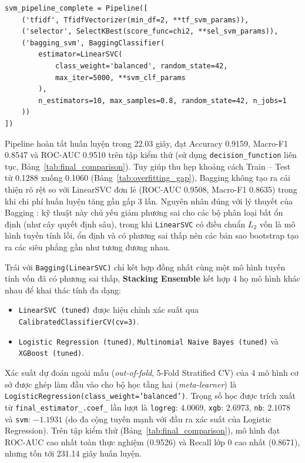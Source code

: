 \begin{lstlisting}[caption={Cài đặt Pipeline khép kín cho mô hình LinearSVC + Bagging}, label={lst:svm_pipeline}]
svm_pipeline_complete = Pipeline([
    ('tfidf', TfidfVectorizer(min_df=2, **tf_svm_params)),
    ('selector', SelectKBest(score_func=chi2, **sel_svm_params)),
    ('bagging_svm', BaggingClassifier(
        estimator=LinearSVC(
            class_weight='balanced', random_state=42,
            max_iter=5000, **svm_clf_params
        ),
        n_estimators=10, max_samples=0.8, random_state=42, n_jobs=1
    ))
])
\end{lstlisting}

Pipeline hoàn tất huấn luyện trong 22.03 giây, đạt Accuracy 0.9159, Macro-F1 0.8547 và ROC-AUC 0.9510 trên tập kiểm thử (sử dụng \texttt{decision\_function} liên tục, Bảng~\ref{tab:final_comparison}). Tuy giúp thu hẹp khoảng cách Train -- Test từ 0.1288 xuống 0.1060 (Bảng~\ref{tab:overfitting_gap}), Bagging không tạo ra cải thiện rõ rệt so với LinearSVC đơn lẻ (ROC-AUC 0.9508, Macro-F1 0.8635) trong khi chi phí huấn luyện tăng gần gấp 3 lần. Nguyên nhân đúng với lý thuyết của Bagging \cite{breiman1996}: kỹ thuật này chủ yếu giảm phương sai cho các bộ phân loại bất ổn định (như cây quyết định sâu), trong khi \texttt{LinearSVC} có điều chuẩn $L_2$ vốn là mô hình tuyến tính lồi, ổn định và có phương sai thấp nên các bản sao bootstrap tạo ra các siêu phẳng gần như tương đương nhau.

Trái với \texttt{Bagging(LinearSVC)} chỉ kết hợp đồng nhất cùng một mô hình tuyến tính vốn đã có phương sai thấp, \textbf{Stacking Ensemble} kết hợp 4 họ mô hình khác nhau để khai thác tính đa dạng:
\begin{itemize}
    \item \texttt{LinearSVC (tuned)} được hiệu chỉnh xác suất qua \texttt{CalibratedClassifierCV(cv=3)}.
    \item \texttt{Logistic Regression (tuned)}, \texttt{Multinomial Naive Bayes (tuned)} và \texttt{XGBoost (tuned)}.
\end{itemize}
Xác suất dự đoán ngoài mẫu (\textit{out-of-fold}, 5-Fold Stratified CV) của 4 mô hình cơ sở được ghép làm đầu vào cho bộ học tầng hai (\textit{meta-learner}) là \texttt{LogisticRegression(class\_weight='balanced')}. Trọng số học được trích xuất từ \texttt{final\_estimator\_.coef\_} lần lượt là \texttt{logreg}: $4.0069$, \texttt{xgb}: $2.6973$, \texttt{nb}: $2.1078$ và \texttt{svm}: $-1.1931$ (do đa cộng tuyến mạnh với đầu ra xác suất của Logistic Regression). Trên tập kiểm thử (Bảng~\ref{tab:final_comparison}), mô hình đạt ROC-AUC cao nhất toàn thực nghiệm (0.9526) và Recall lớp 0 cao nhất (0.8671), nhưng tốn tới 231.14 giây huấn luyện.

